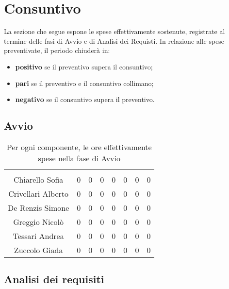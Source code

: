 \section{Consuntivo}

La sezione che segue espone le spese effettivamente sostenute, registrate al termine delle fasi di Avvio e di Analisi dei Requisti. In relazione alle spese preventivate, il periodo chiuderà in:
\begin{itemize}
	\item \textbf{positivo} se il preventivo supera il consuntivo;
	\item \textbf{pari} se il preventivo e il consuntivo collimano;
	\item \textbf{negativo} se il consuntivo supera il preventivo.
\end{itemize}


\subsection{Avvio}

\begin{table}[H]
	\begin{center}
		\begin{tabular}{c
				!{\color[HTML]{9b240a}\vrule width 1pt}
				cccccc
				!{\color[HTML]{9b240a}\vrule width 1pt}	
				c}
			\rowcolorhead
			 &  &  &  &  &  &  &  \\
			
			Chiarello Sofia & 0 & 0 & 0 & 0 & 0 & 0 & 0\\
			Crivellari Alberto & 0 & 0 & 0 & 0 & 0 & 0 & 0\\
			De Renzis Simone & 0 & 0 & 0 & 0 & 0 & 0 & 0\\
			Greggio Nicolò & 0 & 0 & 0 & 0 & 0 & 0 & 0\\
			Tessari Andrea & 0 & 0 & 0 & 0 & 0 & 0 & 0\\
			Zuccolo Giada & 0 & 0 & 0 & 0 & 0 & 0 & 0\\
		\end{tabular}
		\caption[Consuntivo fase di Avvio]{Per ogni componente, le ore effettivamente spese nella fase di Avvio}
	\end{center}
\end{table}




\subsection{Analisi dei requisiti}


